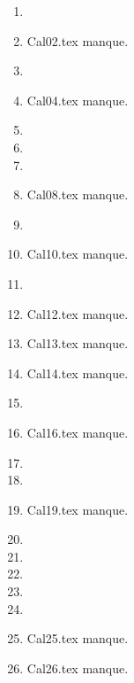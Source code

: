 \begin{enumerate}
  \item  
  \item Cal02.tex manque. 
  \item  
  \item Cal04.tex manque. 
  \item  
  \item  
  \item  
  \item Cal08.tex manque. 
  \item  
  \item Cal10.tex manque. 
  \item  
  \item Cal12.tex manque. 
  \item Cal13.tex manque. 
  \item Cal14.tex manque. 
  \item  
  \item Cal16.tex manque. 
  \item  
  \item  
  \item Cal19.tex manque. 
  \item  
  \item  
  \item  
  \item  
  \item  
  \item Cal25.tex manque. 
  \item Cal26.tex manque. 
\end{enumerate} 

